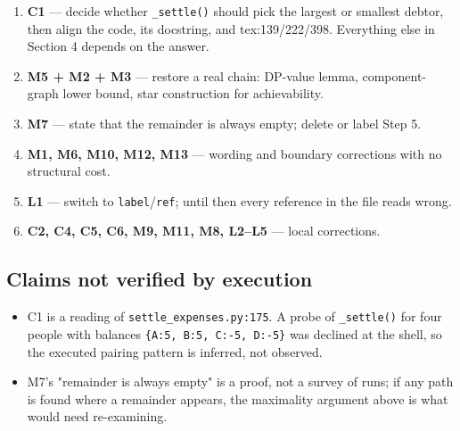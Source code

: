 \documentclass[11pt]{article}
\begin{document}
\begin{enumerate}
  \item \textbf{C1} --- decide whether \texttt{\_settle()} should pick the largest or smallest debtor, then
align the code, its docstring, and tex:139/222/398. Everything else in Section 4 depends on the answer.
  \item \textbf{M5 + M2 + M3} --- restore a real chain: DP-value lemma, component-graph lower bound, star
construction for achievability.
  \item \textbf{M7} --- state that the remainder is always empty; delete or label Step 5.
  \item \textbf{M1, M6, M10, M12, M13} --- wording and boundary corrections with no structural cost.
  \item \textbf{L1} --- switch to \texttt{label}/\texttt{ref}; until then every reference in the file reads
wrong.
  \item \textbf{C2, C4, C5, C6, M9, M11, M8, L2--L5} --- local corrections.
\end{enumerate}

\subsection{Claims not verified by execution}

\begin{itemize}
  \item C1 is a reading of \texttt{settle\_expenses.py:175}. A probe of \texttt{\_settle()} for four
people with balances \texttt{\{A:5, B:5, C:-5, D:-5\}} was declined at the shell, so the executed pairing
pattern is inferred, not observed.
  \item M7's "remainder is always empty" is a proof, not a survey of runs; if any path is found where a
remainder appears, the maximality argument above is what would need re-examining.
\end{itemize}
\end{document}
